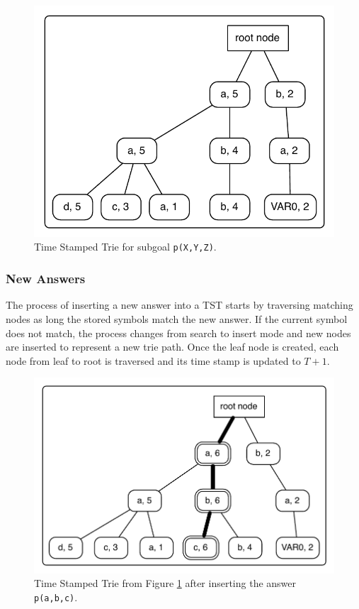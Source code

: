 \begin{figure}[ht]
  \centering
    \includegraphics[scale=0.6]{tst_1.pdf}
  \caption{Time Stamped Trie for subgoal \texttt{p(X,Y,Z)}.}
  \label{fig:tst_1}
\end{figure}

\subsubsection{New Answers}

The process of inserting a new answer into a TST starts by traversing matching nodes as long the stored symbols
match the new answer. If the current symbol does not match, the process changes from search to insert mode and
new nodes are inserted to represent a new trie path. Once the leaf node is created, each node from leaf to root
is traversed and its time stamp is updated to $T + 1$.

\begin{figure}[ht]
  \centering
    \includegraphics[scale=0.6]{tst_2.pdf}
  \caption{Time Stamped Trie from Figure \ref{fig:tst_1} after inserting the answer \texttt{p(a,b,c)}.}
  \label{fig:tst_2}
\end{figure}

